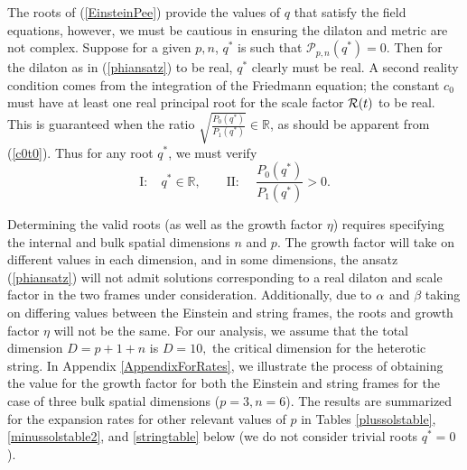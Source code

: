 \documentclass[amsmath,amssymb,11pt]{article}
\begin{document}
The roots of (\ref{EinsteinPee}) provide the values of $q$ that satisfy the field equations, however, we must be cautious in ensuring the dilaton and metric are not complex. Suppose for a given $p,n$, $q^*$ is such that $\mathcal{P}_{p,n}(q^*)=0.$ Then for the dilaton as in (\ref{phiansatz}) to be real, $q^*$ clearly must be real. A second reality condition comes from the integration of the Friedmann equation; the constant $c_0$ must have at least one real principal root for the scale factor $\mathcal{R}(t)$ to be real. This is guaranteed when the ratio $\sqrt{\frac{P_0(q^*)}{P_1(q^*)}}\in\mathbb{R}$, as should be apparent from (\ref{c0t0}). Thus for any root $q^*$, we must verify 
\begin{equation}\label{realcondish}
\text{I:} \ \ \ \ \ q^*\in\mathbb{R}, \  \ \ \ \ \ \ \ \ \text{II:} \ \ \ \ \ \ \frac{P_0(q^*)}{P_1(q^*)}>0.
\end{equation} 


Determining the valid roots (as well as the growth factor $\eta$) requires specifying the internal and bulk spatial dimensions $n$ and $p$. The growth factor will take on different values in each dimension, and in some dimensions, the ansatz (\ref{phiansatz}) will not admit solutions corresponding to a real dilaton and scale factor in the two frames under consideration.  Additionally, due to $\alpha$ and $\beta$ taking on differing values between the Einstein and string frames, the roots and growth factor $\eta$ will not be the same. For our analysis, we assume that the total dimension $D = p+1+n$ is $D=10,$ the critical dimension for the heterotic string. In Appendix \ref{AppendixForRates}, we illustrate the process of obtaining the value for the growth factor for both the Einstein and string frames for the case of three bulk spatial dimensions ($p=3, n=6$). The results are summarized for the expansion rates for other relevant values of $p$ in Tables \ref{plussolstable}, \ref{minussolstable2}, and \ref{stringtable} below (we do not consider trivial roots $q^*=0$). 
\end{document}
